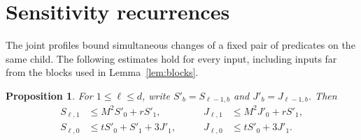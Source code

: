 \documentclass[11pt]{article}
\newtheorem{proposition}[theorem]{Proposition}
\theoremstyle{definition}
\theoremstyle{remark}
\begin{document}
\section{Sensitivity recurrences}
\label{sec:recurrences}

The joint profiles bound simultaneous changes of a fixed pair of predicates
on the same child. The following estimates hold for every input, including
inputs far from the blocks used in Lemma~\ref{lem:blocks}.

\begin{proposition}\label{prop:recurrences}
For $1\leq \ell\leq d$, write
$S'_b=S_{\ell-1,b}$ and $J'_b=J_{\ell-1,b}$.  Then
\begin{equation}\label{eq:recurrences}
\begin{aligned}
 S_{\ell,1}&\leq M^2S'_0+rS'_1,
 &\qquad J_{\ell,1}&\leq M^2J'_0+rS'_1,\\
 S_{\ell,0}&\leq tS'_0+S'_1+3J'_1,
 &\qquad J_{\ell,0}&\leq tS'_0+3J'_1.
\end{aligned}
\end{equation}
\end{proposition}
\end{document}
